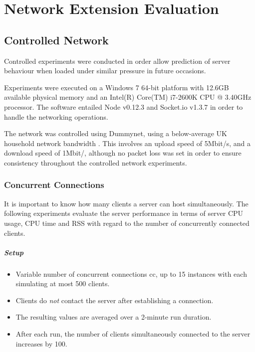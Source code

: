 \documentclass[bsc,frontabs,twoside,singlespacing,parskip,deptreport]{infthesis}     %
\begin{document}
\chapter{Network Extension Evaluation}

\section{Controlled Network}
Controlled experiments were conducted in order allow prediction of server behaviour when loaded under similar pressure in future occasions.

Experiments were executed on a Windows 7 64-bit platform with 12.6GB available physical memory and an Intel(R) Core(TM) i7-2600K CPU @ 3.40GHz processor. The software entailed Node v0.12.3 and Socket.io v1.3.7 in order to handle the networking operations.

The network was controlled using Dummynet, using a below-average UK household network bandwidth \cite{household_bandwidth}. This involves an upload speed of 5Mbit/s, and a download speed of 1Mbit/, although no packet loss was set in order to ensure consistency throughout the controlled network experiments.

\subsection{Concurrent Connections}
It is important to know how many clients a server can host simultaneously. The following experiments evaluate the server performance in terms of server CPU usage, CPU time and RSS with regard to the number of concurrently connected clients.

\paragraph*{Setup}
\begin{itemize}
\item Variable number of concurrent connections cc, up to 15 instances with each simulating at most 500 clients.
\item Clients do \emph{not} contact the server after establishing a connection.
\item The resulting values are averaged over a 2-minute run duration.
\item After each run, the number of clients simultaneously connected to the server increases by 100.
\end{itemize}
\end{document}
